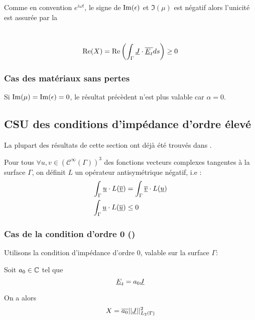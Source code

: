 Comme en convention $e^{i\omega t}$, le signe de $\operatorname{Im}(\epsilon)$ et $\Im(\mu)$ est négatif
alors l'unicité est assurée par la
\begin{defn}~\\
\begin{equation}\label{eq_unicite_form_var_cgu}
\operatorname{Re}(X) = \operatorname{Re}\left(\int_\Gamma \underline{J} \cdot {\overline{\underline{E}_t}} ds\right) \ge 0
\end{equation}
\end{defn}

\subsubsection{Cas des matériaux sans pertes}

Si $\operatorname{Im}(\mu) = \operatorname{Im}(\epsilon) = 0$, le résultat précèdent n'est plus valable car $\alpha = 0$.


\subsection{CSU des conditions d'impédance d'ordre élevé}

La plupart des résultats de cette section ont déjà été trouvés dans \cite{stupfel_sufficient_2011}.


Pour tous $\forall u, v \in (\mathcal C^\infty(\Gamma))^3$ des fonctions vecteurs complexes tangentes à la surface $\Gamma$, on définit $L$ un opérateur antisymétrique négatif, i.e : 
\begin{align*}
\int_\Gamma \underline{u}\cdot L({\overline{\underline{v}}}) &= \int_\Gamma {\overline{\underline{v}}}\cdot L(\underline{u})\\
\int_\Gamma \underline{u}\cdot L({\overline{\underline{u}}}) &\le 0
\end{align*}

\subsubsection{Cas de la condition d'ordre 0 (\cite{stupfel_sufficient_2011})}
Utilisons la condition d’impédance d'ordre 0, valable sur la surface $\Gamma$: 

Soit $a_0 \in \mathbb C$ tel que
\[
\underline{E}_t = a_0 \underline{J}
\]

On a alors
\begin{equation*}
X = {\overline{a_0}}||\underline{J}||_{L_2(\Gamma)}^2
\end{equation*}

